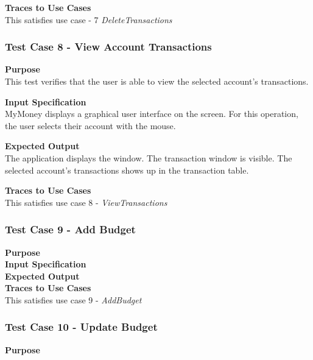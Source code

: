\documentclass[12pt]{article}
\begin{document}
\noindent
{\bf Traces to Use Cases}\\
This satisfies use case  - 7 \textit{DeleteTransactions}

\subsubsection{Test Case 8 - View Account Transactions} \label{TC-8}
\noindent
{\bf Purpose}\\
This test verifies that the user is able to view the selected account's transactions.
                                                        
\noindent
{\bf Input Specification}\\
MyMoney displays a graphical user interface on the screen.
For this operation, the user selects their account with the mouse.

\noindent
{\bf Expected Output}\\
The application displays the window.       
The transaction window is visible.
The selected account's transactions shows up in the transaction table. 

\noindent
{\bf Traces to Use Cases}\\
This satisfies use case 8 - \textit{ViewTransactions}
\clearpage %


\subsubsection{Test Case 9 - Add Budget} \label{TC-9}
\noindent
{\bf Purpose}\\
                                                        
\noindent
{\bf Input Specification}\\

\noindent
{\bf Expected Output}\\

\noindent
{\bf Traces to Use Cases}\\
This satisfies use case 9 - \textit{AddBudget}

\subsubsection{Test Case 10 - Update Budget} \label{TC-10}
\noindent
{\bf Purpose}\\
                                                        
\end{document}
